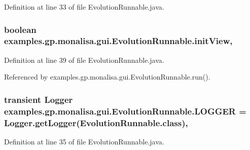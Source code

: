 Definition at line 33 of file Evolution\-Runnable.\-java.

\hypertarget{classexamples_1_1gp_1_1monalisa_1_1gui_1_1_evolution_runnable_a7a665060162ec68a5d6828250bf07444}{
\subsubsection[{init\-View}]{\setlength{\rightskip}{0pt plus 5cm}boolean examples.\-gp.\-monalisa.\-gui.\-Evolution\-Runnable.\-init\-View\hspace{0.3cm}{\ttfamily [static]}, {\ttfamily [protected]}}}\label{classexamples_1_1gp_1_1monalisa_1_1gui_1_1_evolution_runnable_a7a665060162ec68a5d6828250bf07444}


Definition at line 39 of file Evolution\-Runnable.\-java.



Referenced by examples.\-gp.\-monalisa.\-gui.\-Evolution\-Runnable.\-run().

\hypertarget{classexamples_1_1gp_1_1monalisa_1_1gui_1_1_evolution_runnable_ad06c488241ffaff20e75b1d619dca7e6}{
\subsubsection[{L\-O\-G\-G\-E\-R}]{\setlength{\rightskip}{0pt plus 5cm}transient Logger examples.\-gp.\-monalisa.\-gui.\-Evolution\-Runnable.\-L\-O\-G\-G\-E\-R = Logger.\-get\-Logger(Evolution\-Runnable.\-class)\hspace{0.3cm}{\ttfamily [static]}, {\ttfamily [private]}}}\label{classexamples_1_1gp_1_1monalisa_1_1gui_1_1_evolution_runnable_ad06c488241ffaff20e75b1d619dca7e6}


Definition at line 35 of file Evolution\-Runnable.\-java.

